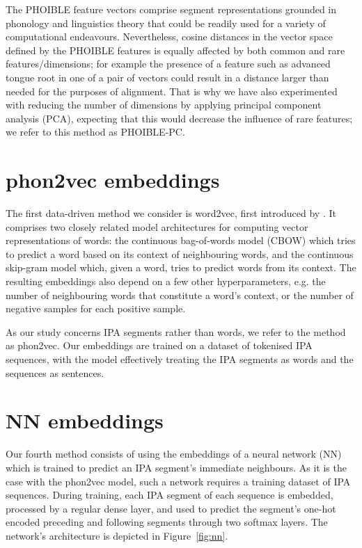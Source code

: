 \documentclass[a4paper]{report}
\begin{document}
The PHOIBLE feature vectors comprise segment representations grounded in phonology and linguistics theory
that could be readily used for a variety of computational endeavours.
Nevertheless, cosine distances in the vector space defined by the PHOIBLE features is equally affected by both common and rare features/dimensions;
for example the presence of a feature such as advanced tongue root in one of a pair of vectors
could result in a distance larger than needed for the purposes of alignment.
That is why we have also experimented with reducing the number of dimensions by applying principal component analysis (PCA),
expecting that this would decrease the influence of rare features; we refer to this method as PHOIBLE-PC.


\section{phon2vec embeddings}

The first data-driven method we consider is word2vec, first introduced by \citet{2013_Mikolov_al}.
It comprises two closely related model architectures for computing vector representations of words:
the continuous bag-of-words model (CBOW) which tries to predict a word based on its context of neighbouring words,
and the continuous skip-gram model which, given a word, tries to predict words from its context.
The resulting embeddings also depend on a few other hyperparameters,
e.g. the number of neighbouring words that constitute a word's context, or the number of negative samples for each positive sample.

As our study concerns IPA segments rather than words, we refer to the method as phon2vec.
Our embeddings are trained on a dataset of tokenised IPA sequences,
with the model effectively treating the IPA segments as words and the sequences as sentences.


\section{NN embeddings}

Our fourth method consists of using the embeddings of a neural network (NN) which is trained to predict an IPA segment's immediate neighbours.
As it is the case with the phon2vec model, such a network requires a training dataset of IPA sequences.
During training, each IPA segment of each sequence is embedded, processed by a regular dense layer,
and used to predict the segment's one-hot encoded preceding and following segments through two softmax layers.
The network's architecture is depicted in Figure~\ref{fig:nn}.
\end{document}
